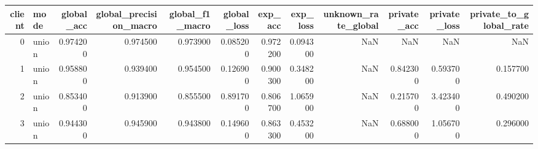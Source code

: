 \begin{tabular}{rlrrrrrrrrrr}
\toprule
client & mode & global_acc & global_precision_macro & global_f1_macro & global_loss & exp_acc & exp_loss & unknown_rate_global & private_acc & private_loss & private_to_global_rate \\
\midrule
0 & union & 0.974200 & 0.974500 & 0.973900 & 0.085200 & 0.972200 & 0.094300 & NaN & NaN & NaN & NaN \\
1 & union & 0.958800 & 0.939400 & 0.954500 & 0.126900 & 0.900300 & 0.348200 & NaN & 0.842300 & 0.593700 & 0.157700 \\
2 & union & 0.853400 & 0.913900 & 0.855500 & 0.891700 & 0.806700 & 1.065900 & NaN & 0.215700 & 3.423400 & 0.490200 \\
3 & union & 0.944300 & 0.945900 & 0.943800 & 0.149600 & 0.863300 & 0.453200 & NaN & 0.688000 & 1.056700 & 0.296000 \\
\bottomrule
\end{tabular}
